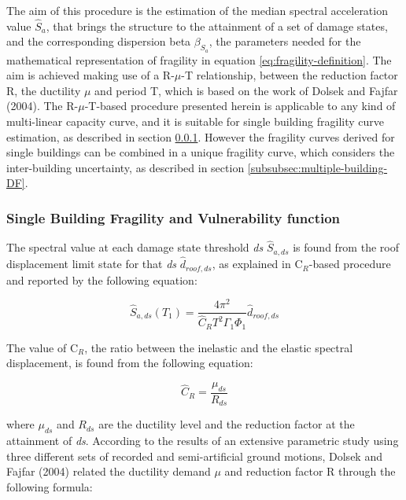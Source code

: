 The aim of this procedure is the estimation of the median spectral acceleration value $\hat{S}_a$, that brings the structure to the attainment of a set of damage states, and the corresponding dispersion beta $\beta_{S_a}$, the parameters needed for the mathematical representation of fragility in equation \ref{eq:fragility-definition}. The aim is achieved making use of a R-$\mu$-T relationship, between the reduction factor R, the ductility $\mu$ and period T, which is based on the work of Dolsek and Fajfar (2004). The R-$\mu$-T-based procedure presented herein is applicable to any kind of multi-linear capacity curve, and it is suitable for single building fragility curve estimation, as described in section \ref{subsubsec:single-building-DF}. However the fragility curves derived for single buildings can be combined in a unique fragility curve, which considers the inter-building uncertainty, as described in section \ref{subsubsec:multiple-building-DF}.

\subsubsection{Single Building Fragility and Vulnerability function}
\label{subsubsec:single-building-DF}
The spectral value at each damage state threshold \textit{ds} $\hat{S}_{a,ds}$ is found from the roof displacement limit state for that \textit{ds} $\hat{d}_{roof, ds}$, as explained in C$_{R}$-based procedure and reported by the following equation:

\begin{equation}
\hat{S}_{a,ds}(T_1) = \frac{4 \pi^2}{\hat{C}_R T^2 \Gamma_1 \Phi_1} \hat{d}_{roof, ds}
\label{eq:basic_DF}
\end{equation}

The value of C$_R$, the ratio between the inelastic and the elastic spectral displacement, is found from the following equation:

\begin{equation}
\hat{C}_{R} = \frac{\mu_{ds}}{R_{ds}}
\label{eq:Cr_DF}
\end{equation}

where $\mu_{ds}$ and $R_{ds}$ are the ductility level and the reduction factor at the attainment of \textit{ds}. According to the results of an extensive parametric study using three different sets of recorded and semi-artificial ground motions, Dolsek and Fajfar (2004) related the ductility demand $\mu$ and reduction factor R through the following formula:

